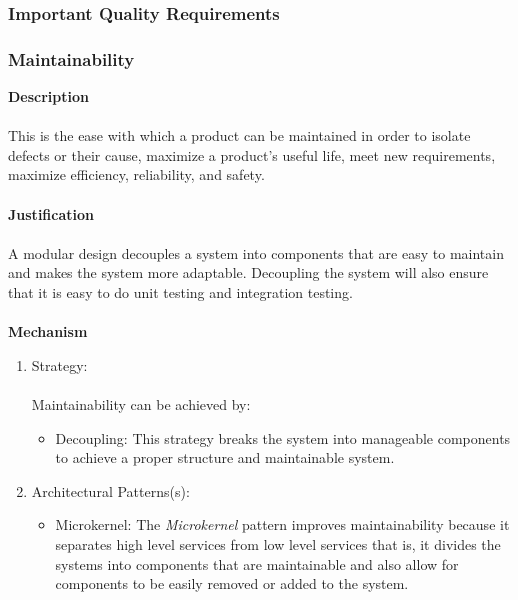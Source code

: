 		\subsubsection{Important Quality Requirements}
			\subsubsection*{Maintainability}
			\textbf{Description}\\\\
			This is the ease with which a product can be maintained in order to isolate defects or their cause, maximize a product's useful life, meet new requirements, maximize efficiency, reliability, and safety.\\\\
			\textbf{Justification}\\\\
			A modular design decouples a system into components that are easy to maintain and makes the system more adaptable. Decoupling the system will also ensure that it is easy to do unit testing and integration testing.\\\\
			\textbf{Mechanism}
			\begin{enumerate}
				\item Strategy:\\\\
				Maintainability can be achieved by:
				\begin{itemize}
				\item Decoupling: This strategy breaks the system into manageable components to achieve a proper structure and maintainable system.  
				\end{itemize}
				\item Architectural Patterns(s):
				\begin{itemize}
				\item Microkernel: The \emph{Microkernel} pattern improves maintainability because it separates high level services  from low level services that is, it divides the systems into components that are maintainable and also allow for components to be easily removed or added to the system.
				\end{itemize}
			\end{enumerate}
			\newpage
